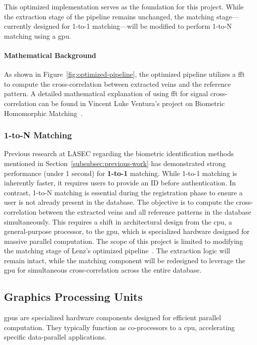 This optimized implementation serves as the foundation for this project. While the extraction stage of the pipeline remains unchanged, the matching stage—currently designed for 1-to-1 matching—will be modified to perform 1-to-N matching using a \acrshort{gpu}.

\paragraph*{Mathematical Background}
As shown in Figure~\ref{fig:optimized-pipeline}, the optimized pipeline utilizes a \acrfull{fft} to compute the cross-correlation between extracted veins and the reference pattern. A detailed mathematical explanation of using \acrshort{fft} for signal cross-correlation can be found in Vincent Luke Ventura's project on Biometric Homomorphic Matching~\cite{VincentLukeVentura26}.

\subsubsection{1-to-N Matching}
Previous research at LASEC regarding the biometric identification methods mentioned in Section~\ref{subsubsec:previous-work} has demonstrated strong performance (under 1 second) for \textbf{1-to-1} matching. While 1-to-1 matching is inherently faster, it requires users to provide an ID before authentication. In contrast, 1-to-N matching is essential during the registration phase to ensure a user is not already present in the database.
\mypar
The objective is to compute the cross-correlation between the extracted veins and all reference patterns in the database simultaneously. This requires a shift in architectural design from the \acrshort{cpu}, a general-purpose processor, to the \acrshort{gpu}, which is specialized hardware designed for massive parallel computation.
\mypar
The scope of this project is limited to modifying the matching stage of Lenz's optimized pipeline~\cite{OptimizedPipelineLaraSofieLenz24}. The extraction logic will remain intact, while the matching component will be redesigned to leverage the \acrshort{gpu} for simultaneous cross-correlation across the entire database.

\subsection{Graphics Processing Units}
\acrfull{gpu}s are specialized hardware components designed for efficient parallel computation. They typically function as co-processors to a \acrshort{cpu}, accelerating specific data-parallel applications.

